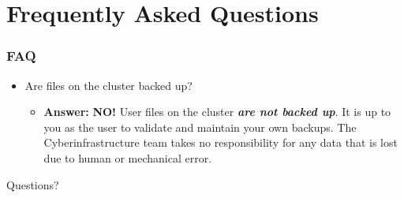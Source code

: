 \documentclass[t,hyperref={pdfpagelabels=false}]{beamer}
\begin{document}
\section{Frequently Asked Questions}
\begin{frame}
\frametitle{FAQ}
\begin{itemize}
	\item Are files on the cluster backed up?
	\begin{itemize}\footnotesize
	\item \textbf{Answer:} \textbf{NO!}  User files on the cluster \textbf{\emph{are not backed up}}.  It is up to you as the user to validate and maintain your own backups.  The Cyberinfrastructure team takes no responsibility for any data that is lost due to human or mechanical error.  
	\end{itemize}
\end{itemize}
\end{frame}


\begin{frame}
\Huge{\centerline{Questions?}}
\end{frame}
\end{document}
